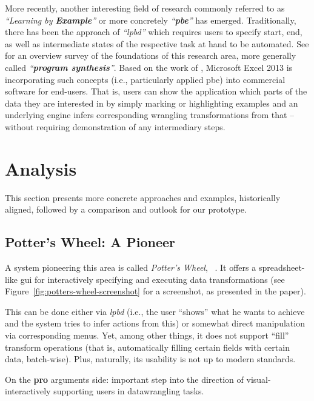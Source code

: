 More recently, another interesting field of research commonly referred to as \emph{``Learning by \textbf{Example}''} or more concretely \emph{``\textbf{\gls{pbe}}''} has emerged.
Traditionally, there has been the approach of \emph{``\gls{lpbd}''} which requires users to specify start, end, as well as intermediate states of the respective task at hand to be automated.
See \cite{Gulwani2010} for an overview survey of the foundations of this research area, more generally called \emph{``\textbf{program synthesis}''}.
Based on the work of \cite{Gulwani2011}, Microsoft Excel 2013 is incorporating such concepts (i.e., particularly applied \gls{pbe}) into commercial software for end-users.
That is, users can show the application which parts of the data they are interested in by simply marking or highlighting examples and an underlying engine infers corresponding wrangling transformations from that -- without requiring demonstration of any intermediary steps.


\section{Analysis}

This section presents more concrete approaches and examples, historically aligned, followed by a comparison and outlook for our prototype.

\subsection{Potter's Wheel: A Pioneer}

A system pioneering this area is called \emph{Potter's Wheel}, ~\cite{Raman2001a}. It offers a spreadsheet-like \gls{gui} for interactively specifying and executing data transformations (see Figure~\ref{fig:potters-wheel-screenshot} for a screenshot, as presented in the paper).

This can be done either via \emph{\gls{lpbd}} (i.e., the user ``shows'' what he wants to achieve and the system tries to infer actions from this) or somewhat direct manipulation via corresponding menus.
Yet, among other things, it does not support ``fill'' transform operations (that is, automatically filling certain fields with certain data, batch-wise).
Plus, naturally, its usability is not up to modern standards.

On the \textbf{pro} arguments side: important step into the direction of visual-interactively supporting users in \gls{datawrangling} tasks.

